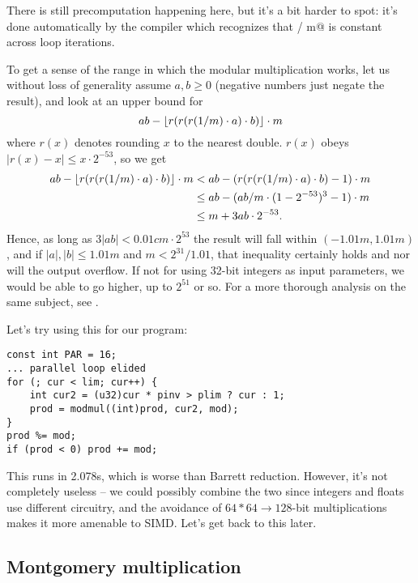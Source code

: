 There is still precomputation happening here, but it's a bit harder to spot: it's done automatically by the compiler which recognizes that  / m@ is constant across loop iterations.

To get a sense of the range in which the modular multiplication works, let us without loss of generality assume $a,b \ge 0$ (negative numbers just negate the result), and look at an upper bound for
\[ ab - \lfloor r(r(r(1/m)\cdot a)\cdot b)\rfloor \cdot m \]
where $r(x)$ denotes rounding $x$ to the nearest double.
$r(x)$ obeys $|r(x) - x| \le x \cdot 2^{-53}$, so we get
\begin{align*}
ab - \lfloor r(r(r(1/m)\cdot a)\cdot b)\rfloor \cdot m
&< ab - (r(r(r(1/m)\cdot a)\cdot b) - 1) \cdot m \\
&\le ab - (ab/m \cdot (1 - 2^{-53})^3 - 1) \cdot m \\
&\le m + 3ab \cdot 2^{-53}.
\end{align*}
Hence, as long as $3|ab| < 0.01 c m \cdot 2^{53}$ the result will fall within $(-1.01m, 1.01m)$, and if $|a|,|b| \le 1.01 m$ and $m < 2^{31} / 1.01$, that inequality certainly holds and nor will the output overflow. If not for using 32-bit integers as input parameters, we would be able to go higher, up to $2^{51}$ or so. For a more thorough analysis on the same subject, see \cite{modmulproof}.

Let's try using this for our program:

\begin{lstlisting}
const int PAR = 16;
... parallel loop elided
for (; cur < lim; cur++) {
	int cur2 = (u32)cur * pinv > plim ? cur : 1;
	prod = modmul((int)prod, cur2, mod);
}
prod %= mod;
if (prod < 0) prod += mod;
\end{lstlisting}

This runs in 2.078s, which is worse than Barrett reduction. However, it's not completely useless -- we could possibly combine the two since integers and floats use different circuitry, and the avoidance of \mbox{$64*64\rightarrow128$}-bit multiplications makes it more amenable to SIMD. Let's get back to this later.

\subsection{Montgomery multiplication}

